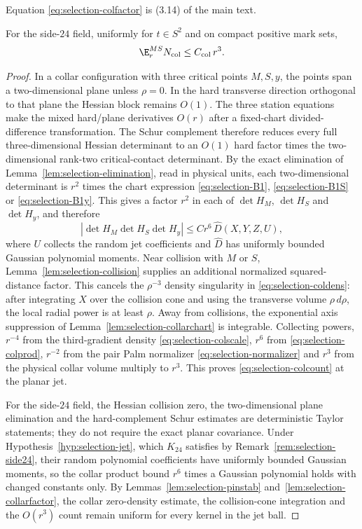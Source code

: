 Equation \eqref{eq:selection-colfactor} is (3.14) of the main text.

\begin{lemma}\label{lem:selection-collar}
For the side-$24$ field, uniformly for $t\in S^2$ and on compact positive mark sets,
\begin{equation}\label{eq:selection-colcount}
\E^{MS}_rN_{\rm col}\le C_{\rm col}\,r^3 .
\end{equation}
\end{lemma}

\begin{proof}
In a collar configuration with three critical points $M,S,y$, the points span a two-dimensional plane unless $\rho=0$. In the hard transverse direction orthogonal to that plane the Hessian block remains $O(1)$. The three station equations make the mixed hard/plane derivatives $O(r)$ after a fixed-chart divided-difference transformation. The Schur complement therefore reduces every full three-dimensional Hessian determinant to an $O(1)$ hard factor times the two-dimensional rank-two critical-contact determinant. By the exact elimination of Lemma~\ref{lem:selection-elimination}, read in physical units, each two-dimensional determinant is $r^2$ times the chart expression \eqref{eq:selection-B1}, \eqref{eq:selection-B1S} or \eqref{eq:selection-B1y}. This gives a factor $r^2$ in each of $\det H_M$, $\det H_S$ and $\det H_y$, and therefore
\begin{equation}\label{eq:selection-colprod}
|\det H_M\det H_S\det H_y|\le Cr^6\,\hat D(X,Y,Z,U),
\end{equation}
where $U$ collects the random jet coefficients and $\hat D$ has uniformly bounded Gaussian polynomial moments. Near collision with $M$ or $S$, Lemma~\ref{lem:selection-collision} supplies an additional normalized squared-distance factor. This cancels the $\rho^{-3}$ density singularity in \eqref{eq:selection-coldens}: after integrating $X$ over the collision cone and using the transverse volume $\rho\,d\rho$, the local radial power is at least $\rho$. Away from collisions, the exponential axis suppression of Lemma~\ref{lem:selection-collarchart} is integrable. Collecting powers, $r^{-4}$ from the third-gradient density \eqref{eq:selection-colscale}, $r^6$ from \eqref{eq:selection-colprod}, $r^{-2}$ from the pair Palm normalizer \eqref{eq:selection-normalizer} and $r^3$ from the physical collar volume multiply to $r^3$. This proves \eqref{eq:selection-colcount} at the planar jet.

For the side-$24$ field, the Hessian collision zero, the two-dimensional plane elimination and the hard-complement Schur estimates are deterministic Taylor statements; they do not require the exact planar covariance. Under Hypothesis~\ref{hyp:selection-jet}, which $K_{24}$ satisfies by Remark~\ref{rem:selection-side24}, their random polynomial coefficients have uniformly bounded Gaussian moments, so the collar product bound $r^6$ times a Gaussian polynomial holds with changed constants only. By Lemmas~\ref{lem:selection-pinstab} and~\ref{lem:selection-collarfactor}, the collar zero-density estimate, the collision-cone integration and the $O(r^3)$ count remain uniform for every kernel in the jet ball.
\end{proof}

